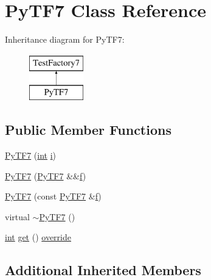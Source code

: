 \hypertarget{class_py_t_f7}{}\section{Py\+T\+F7 Class Reference}
\label{class_py_t_f7}
Inheritance diagram for Py\+T\+F7\+:\begin{figure}[H]
\begin{center}
\leavevmode
\includegraphics[height=2.000000cm]{class_py_t_f7}
\end{center}
\end{figure}
\subsection*{Public Member Functions}
\begin{DoxyCompactItemize}
\item 
\mbox{\hyperlink{class_py_t_f7_abc3e5dac7cbbb241ca80294e516a3efc}{Py\+T\+F7}} (\mbox{\hyperlink{warnings_8h_a74f207b5aa4ba51c3a2ad59b219a423b}{int}} \mbox{\hyperlink{abstract_8h_a13235ab5ddf5c2ccd5ca35ab01d91328}{i}})
\item 
\mbox{\hyperlink{class_py_t_f7_a35160cf73d3200be6baac8de3503343c}{Py\+T\+F7}} (\mbox{\hyperlink{class_py_t_f7}{Py\+T\+F7}} \&\&\mbox{\hyperlink{_s_d_l__opengl__glext_8h_a691492ec0bd6383f91200e49f6ae40ed}{f}})
\item 
\mbox{\hyperlink{class_py_t_f7_ab6da47d3d1088859f31b3a0f03fdefc8}{Py\+T\+F7}} (const \mbox{\hyperlink{class_py_t_f7}{Py\+T\+F7}} \&\mbox{\hyperlink{_s_d_l__opengl__glext_8h_a691492ec0bd6383f91200e49f6ae40ed}{f}})
\item 
virtual \mbox{\hyperlink{class_py_t_f7_ab7ed843473a7f728ddb4c7eeb43e9f9e}{$\sim$\+Py\+T\+F7}} ()
\item 
\mbox{\hyperlink{warnings_8h_a74f207b5aa4ba51c3a2ad59b219a423b}{int}} \mbox{\hyperlink{class_py_t_f7_a064ae84a4d7c8bf5c8453aa96ad817b9}{get}} () \mbox{\hyperlink{dictobject_8h_a055cf4fd16bde9bce026127362cee1a3}{override}}
\end{DoxyCompactItemize}
\subsection*{Additional Inherited Members}


